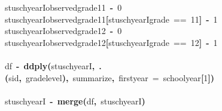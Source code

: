 \documentclass[12pt]{article}
\makeatletter
\newcommand{\hlnumber}[1]{\textcolor[rgb]{0,0,0}{#1}}%
\newcommand{\hlfunctioncall}[1]{\textcolor[rgb]{0.501960784313725,0,0.329411764705882}{\textbf{#1}}}%
\newcommand{\hlkeyword}[1]{\textcolor[rgb]{0,0,0}{\textbf{#1}}}%
\newcommand{\hlargument}[1]{\textcolor[rgb]{0.690196078431373,0.250980392156863,0.0196078431372549}{#1}}%
\newcommand{\hlassignement}[1]{\textcolor[rgb]{0,0,0}{\textbf{#1}}}%
\newcommand{\hlsymbol}[1]{\textcolor[rgb]{0,0,0}{#1}}%
\newcommand{\hlstd}[1]{\textcolor[rgb]{0,0,0}{#1}}%
\newenvironment{kframe}{%
 \def\FrameCommand##1{\hskip\@totalleftmargin \hskip-\fboxsep
 \colorbox{shadecolor}{##1}\hskip-\fboxsep
     \hskip-\linewidth \hskip-\@totalleftmargin \hskip\columnwidth}%
 \MakeFramed {\advance\hsize-\width
   \@totalleftmargin\z@ \linewidth\hsize
   \@setminipage}}%
 {\par\unskip\endMakeFramed}
\newenvironment{knitrout}{}{} %
\renewenvironment{knitrout}{\begin{footnotesize}}{\end{footnotesize}}
\makeatother
\begin{document}
\begin{knitrout}
\begin{kframe}
\begin{flushleft}
\hlstd{}\hlsymbol{stuschyearI}\hlkeyword{\usebox{\hlnormalsizeboxdollar}}\hlsymbol{observed\usebox{\hlnormalsizeboxunderscore}grade\usebox{\hlnormalsizeboxunderscore}11}{\ }\hlassignement{\usebox{\hlnormalsizeboxlessthan}-}{\ }\hlnumber{0}\hspace*{\fill}\\
\hlstd{}\hlsymbol{stuschyearI}\hlkeyword{\usebox{\hlnormalsizeboxdollar}}\hlsymbol{observed\usebox{\hlnormalsizeboxunderscore}grade\usebox{\hlnormalsizeboxunderscore}11}\hlkeyword{[}\hlsymbol{stuschyearI}\hlkeyword{\usebox{\hlnormalsizeboxdollar}}\hlsymbol{grade}{\ }=={\ }\hlnumber{11}\hlkeyword{]}{\ }\hlassignement{\usebox{\hlnormalsizeboxlessthan}-}{\ }\hlnumber{1}\hspace*{\fill}\\
\hlstd{}\hlsymbol{stuschyearI}\hlkeyword{\usebox{\hlnormalsizeboxdollar}}\hlsymbol{observed\usebox{\hlnormalsizeboxunderscore}grade\usebox{\hlnormalsizeboxunderscore}12}{\ }\hlassignement{\usebox{\hlnormalsizeboxlessthan}-}{\ }\hlnumber{0}\hspace*{\fill}\\
\hlstd{}\hlsymbol{stuschyearI}\hlkeyword{\usebox{\hlnormalsizeboxdollar}}\hlsymbol{observed\usebox{\hlnormalsizeboxunderscore}grade\usebox{\hlnormalsizeboxunderscore}12}\hlkeyword{[}\hlsymbol{stuschyearI}\hlkeyword{\usebox{\hlnormalsizeboxdollar}}\hlsymbol{grade}{\ }=={\ }\hlnumber{12}\hlkeyword{]}{\ }\hlassignement{\usebox{\hlnormalsizeboxlessthan}-}{\ }\hlnumber{1}\hspace*{\fill}\\
\hlstd{}\hspace*{\fill}\\
\hlstd{}\hlsymbol{df}{\ }\hlassignement{\usebox{\hlnormalsizeboxlessthan}-}{\ }\hlfunctioncall{ddply}\hlkeyword{(}\hlsymbol{stuschyearI}\hlkeyword{,}{\ }\hlfunctioncall{.}\hlkeyword{(}\hlsymbol{sid}\hlkeyword{,}{\ }\hlsymbol{grade\usebox{\hlnormalsizeboxunderscore}level}\hlkeyword{)}\hlkeyword{,}{\ }\hlsymbol{summarize}\hlkeyword{,}{\ }\hlargument{first\usebox{\hlnormalsizeboxunderscore}year}{\ }\hlargument{=}{\ }\hlsymbol{school\usebox{\hlnormalsizeboxunderscore}year}\hlkeyword{[}\hlnumber{1}\hlkeyword{]}\hlkeyword{)}\hspace*{\fill}\\
\hlstd{}\hspace*{\fill}\\
\hlstd{}\hlsymbol{stuschyearI}{\ }\hlassignement{\usebox{\hlnormalsizeboxlessthan}-}{\ }\hlfunctioncall{merge}\hlkeyword{(}\hlsymbol{df}\hlkeyword{,}{\ }\hlsymbol{stuschyearI}\hlkeyword{)}\hspace*{\fill}\\

\end{flushleft}
\end{kframe}
\end{knitrout}
\end{document}
